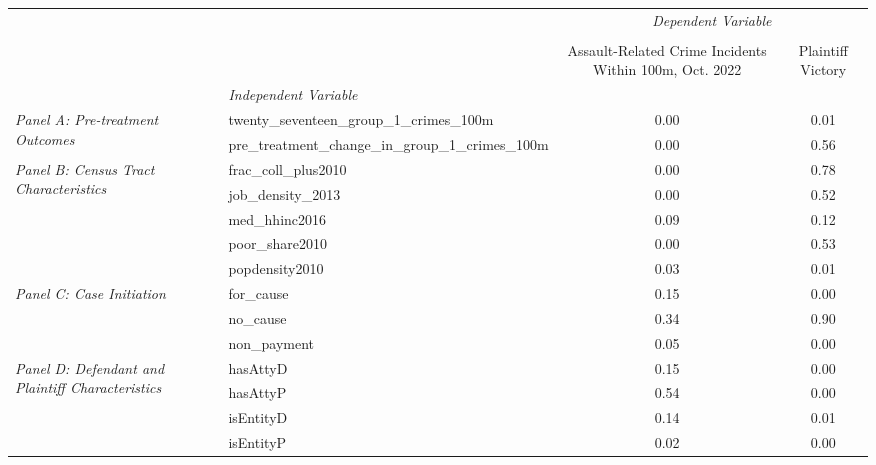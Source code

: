 \begin{tabular}{llcc}
\toprule
 &  & \multicolumn{2}{c}{\textit{Dependent Variable}} \\
\cline{3-4}
\\
 &  & Assault-Related Crime Incidents Within 100m, Oct. 2022 & Plaintiff Victory \\
 & \emph{Independent Variable} &  &  \\
\midrule
\multirow[c]{2}{3cm}{\textit{Panel A: Pre-treatment Outcomes}} & twenty_seventeen_group_1_crimes_100m & 0.00 & 0.01 \\
 & pre_treatment_change_in_group_1_crimes_100m & 0.00 & 0.56 \\
\cline{1-4}
\multirow[c]{5}{3cm}{\textit{Panel B: Census Tract Characteristics}} & frac_coll_plus2010 & 0.00 & 0.78 \\
 & job_density_2013 & 0.00 & 0.52 \\
 & med_hhinc2016 & 0.09 & 0.12 \\
 & poor_share2010 & 0.00 & 0.53 \\
 & popdensity2010 & 0.03 & 0.01 \\
\cline{1-4}
\multirow[c]{3}{3cm}{\textit{Panel C: Case Initiation}} & for_cause & 0.15 & 0.00 \\
 & no_cause & 0.34 & 0.90 \\
 & non_payment & 0.05 & 0.00 \\
\cline{1-4}
\multirow[c]{4}{3cm}{\textit{Panel D: Defendant and Plaintiff Characteristics}} & hasAttyD & 0.15 & 0.00 \\
 & hasAttyP & 0.54 & 0.00 \\
 & isEntityD & 0.14 & 0.01 \\
 & isEntityP & 0.02 & 0.00 \\
\cline{1-4}
\bottomrule
\end{tabular}
